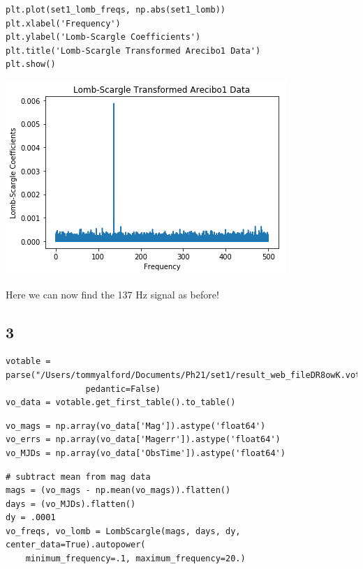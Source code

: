 \documentclass[11pt]{article}
\begin{document}
\begin{verbatim}
plt.plot(set1_lomb_freqs, np.abs(set1_lomb))
plt.xlabel('Frequency')
plt.ylabel('Lomb-Scargle Coefficients')
plt.title('Lomb-Scargle Transformed Arecibo1 Data')
plt.show()
\end{verbatim}

\includegraphics[width=.9\linewidth]{./obipy-resources/33340C.png}

Here we can now find the 137 Hz signal as before!

\subsection*{3}
\label{sec-3-3}
\begin{verbatim}
votable = parse("/Users/tommyalford/Documents/Ph21/set1/result_web_fileDR8owK.vot", 
                pedantic=False)
vo_data = votable.get_first_table().to_table()
\end{verbatim}


\begin{verbatim}
vo_mags = np.array(vo_data['Mag']).astype('float64')
vo_errs = np.array(vo_data['Magerr']).astype('float64')
vo_MJDs = np.array(vo_data['ObsTime']).astype('float64')
\end{verbatim}


\begin{verbatim}
# subtract mean from mag data
mags = (vo_mags - np.mean(vo_mags)).flatten()
days = (vo_MJDs).flatten()
dy = .0001
vo_freqs, vo_lomb = LombScargle(mags, days, dy, center_data=True).autopower(
    minimum_frequency=.1, maximum_frequency=20.)
\end{verbatim}
\end{document}
